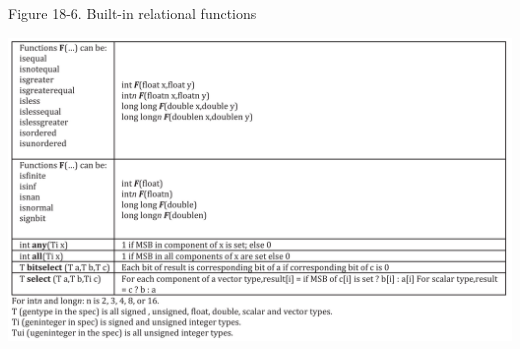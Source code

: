 \hspace*{\fill} \par %
Figure 18-6. Built-in relational functions
\begin{center}
	\includegraphics[width=1.0\textwidth]{content/chapter-18/images/6}
\end{center}




























































